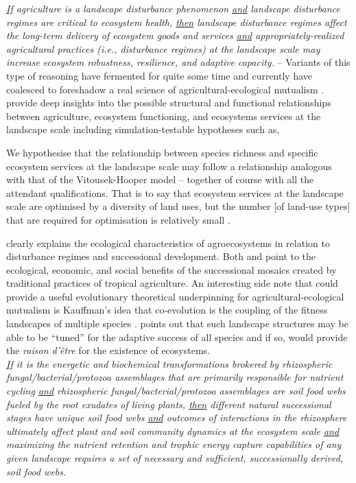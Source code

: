 \textit{\underline{If} agriculture is a landscape disturbance phenomenon \underline{and} landscape disturbance regimes are critical to ecosystem health, \underline{then} landscape disturbance regimes affect the long-term delivery of ecosystem goods and services \underline{and} appropriately-realized agricultural practices (i.e., disturbance regimes) at the landscape scale may increase ecosystem robustness, resilience, and adaptive capacity.} -- Variants of this type of reasoning have fermented for quite some time and currently have coalesced to foreshadow a real science of agricultural-ecological mutualism \citep{swift_biodiversity_2004, gliessman_agroecology:_2015}. \citet{swift_biodiversity_2004} provide deep insights into the possible structural and functional relationships between agriculture, ecosystem functioning, and ecosystems services at the landscape scale including simulation-testable hypotheses such as,
\begin{myindentpar}{2em}
We hypothesise that the relationship between species richness and specific ecosystem services at the landscape scale may follow a relationship analogous with that of the Vitousek-Hooper model -- together of course with all the attendant qualifications. That is to say that ecosystem services at the landscape scale are optimised by a diversity of land uses, but the number [of land-use types] that are required for optimisation is relatively small \citep{swift_biodiversity_2004}.
\end{myindentpar}
\citet{gliessman_agroecology:_2015} clearly explains the ecological characteristics of agroecosystems in relation to disturbance regimes and successional development.  Both \citet{swift_biodiversity_2004} and \citet{gliessman_agroecology:_2015} point to the ecological, economic, and social benefits of the successional mosaics created by traditional practices of tropical agriculture. An interesting side note that could provide a useful evolutionary theoretical underpinning for agricultural-ecological mutualism is Kauffman's idea that co-evolution is the coupling of the fitness landscapes of multiple species \citep{kauffman_origins_1993}. \citet{kauffman_origins_1993} points out that such landscape structures may be able to be \enquote{tuned} for the adaptive success of all species and if so, would provide the \textit{raison d'\^{e}tre} for the existence of ecosystems.\\

\textit{\underline{If} it is the energetic and biochemical transformations brokered by rhizospheric fungal/bacterial/protozoa assemblages that are primarily responsible for nutrient cycling \underline{and} rhizospheric fungal/bacterial/protozoa assemblages are soil food webs fueled by the root exudates of living plants, \underline{then} different natural successional stages have unique soil food webs \underline{and} outcomes of interactions in the rhizosphere ultimately affect plant and soil community dynamics at the ecosystem scale \underline{and} maximizing the nutrient retention and trophic energy capture capabilities of any given landscape requires a set of necessary and sufficient, successionally derived, soil food webs.}\\

